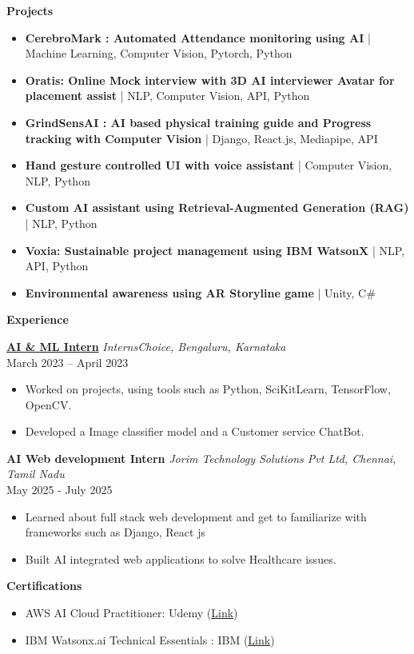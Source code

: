 \documentclass{article}
\newcommand{\resumesection}[1]{
  \vspace{10pt}
  {\RaggedRight\Large\textbf{#1}}
  \par\vspace{5pt}
}
\newcommand{\resumesubsection}[2]{
  \textbf{#1} \hfill #2 \\
}
\begin{document}
\resumesection{Projects}
\begin{itemize}[leftmargin=*,noitemsep,topsep=0pt,partopsep=0pt]
  \item \textbf{CerebroMark : Automated Attendance monitoring using AI} | Machine Learning, Computer Vision, Pytorch, Python
  \item \textbf{Oratis: Online Mock interview with 3D AI interviewer Avatar for placement assist} | NLP, Computer Vision, API, Python
  \item \textbf{GrindSensAI : AI based physical training guide and Progress tracking with Computer Vision} | Django, React.js, Mediapipe, API
  \item \textbf{Hand gesture controlled UI with voice assistant} | Computer Vision, NLP, Python
  \item \textbf{Custom AI assistant using Retrieval-Augmented Generation (RAG)} | NLP, Python
  \item \textbf{Voxia: Sustainable project management using IBM WatsonX} | NLP, API, Python
  \item \textbf{Environmental awareness using AR Storyline game} | Unity, C\#
\end{itemize}

\resumesection{Experience}
\resumesubsection{\href{https://www.linkedin.com/in/neil-joseph-79b74025b}{AI \& ML Intern}}{\textit{InternsChoice, Bengaluru, Karnataka}}
March 2023 – April 2023
\begin{itemize}[leftmargin=*,noitemsep,topsep=0pt,partopsep=0pt]
  \item Worked on projects, using tools such as Python, SciKitLearn, TensorFlow, OpenCV.
  \item Developed a Image classifier model and a Customer service ChatBot.
\end{itemize}

\resumesubsection{AI Web development Intern}{\textit{Jorim Technology Solutions Pvt Ltd, Chennai, Tamil Nadu}}
May 2025 - July 2025
\begin{itemize}[leftmargin=*,noitemsep,topsep=0pt,partopsep=0pt]
  \item Learned about full stack web development and get to familiarize with frameworks such as Django, React js
  \item Built AI integrated web applications to solve Healthcare issues.
\end{itemize}

\resumesection{Certifications}
\begin{itemize}[leftmargin=*,noitemsep,topsep=0pt,partopsep=0pt]
  \item AWS AI Cloud Practitioner: Udemy (\href{https://www.credly.com/badges/c03d002f-b413-4e4f-b040-0c46b1a3e6f9/public_url}{Link})
  \item IBM Watsonx.ai Technical Essentials : IBM (\href{https://www.credly.com/badges/f1d7d024-5d5e-4c7a-9c7f-0b3c6e9f1a0b/public_url}{Link})
\end{itemize}
\end{document}
